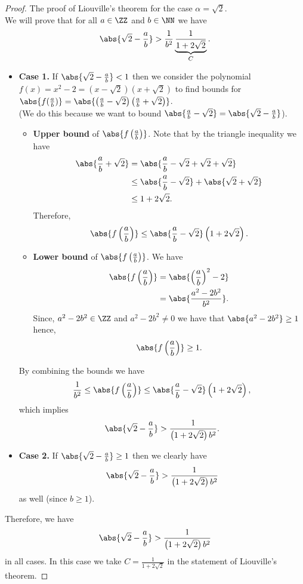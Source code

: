 \documentclass[12pt, a4paper]{article}
\begin{document}
\begin{proof}
    The proof of Liouville's theorem for the case \(\alpha=\sqrt{2}\).\\
    We will prove that for all \(a \in \ZZ\) and \(b \in \NN\) we have
    \[\abs{\sqrt{2}-\frac{a}{b}} > \frac{1}{b^2} \underbrace{\frac{1}{1+2\sqrt{2}}}_{C}.\]
    \begin{itemize}
        \item \textbf{Case 1.} If \(\abs{\sqrt{2}-\frac{a}{b}}<1\) then we consider the polynomial \(f(x)=x^2-2=(x-\sqrt{2})(x+\sqrt{2})\) to find bounds for \(\abs{f(\frac{a}{b})}=\abs{\left( \frac{a}{b} - \sqrt{2} \right) \left( \frac{a}{b} + \sqrt{2}\right)}\). \\
        (We do this because we want to bound \(\abs{\frac{a}{b} - \sqrt{2}}=\abs{\sqrt{2}-\frac{a}{b}}\)).

        \begin{itemize}
            \item \textbf{Upper bound} of \(\abs{f\left( \frac{a}{b} \right)}\). Note that by the triangle inequality we have
            \[\begin{aligned}
                \abs{\frac{a}{b}+\sqrt{2}} &=\abs{\frac{a}{b}-\sqrt{2}+\sqrt{2}+\sqrt{2}}  \\
                &\leq \abs{\frac{a}{b}-\sqrt{2}}+\abs{\sqrt{2}+\sqrt{2}} \\
                &\leq 1+2\sqrt{2}.
            \end{aligned}\]
            Therefore,
            \[\abs{f\left( \frac{a}{b} \right)} \leq \abs{\frac{a}{b}-\sqrt{2}} \left( 1+2\sqrt{2} \right).\]
            \item \textbf{Lower bound} of \(\abs{f\left( \frac{a}{b} \right)}\). We have 
            \[\begin{aligned}
                \abs{f\left( \frac{a}{b} \right)} &=\abs{\left( \frac{a}{b} \right)^2 -2} \\
                &= \abs{\frac{a^2-2b^2}{b^2}}.
            \end{aligned}\]
            Since, \(a^2-2b^2 \in \ZZ\) and \(a^2-2b^2 \neq 0\) we have that \(\abs{a^2-2b^2}\geq 1\) hence,
            \[\abs{f\left( \frac{a}{b} \right)} \geq 1.\]
        \end{itemize}
        By combining the bounds we have
        \[\frac{1}{b^2} \leq \abs{f\left( \frac{a}{b} \right)} \leq \abs{\frac{a}{b}-\sqrt{2}}\left( 1+2\sqrt{2} \right),\]
        which implies
        \[\abs{\sqrt{2}-\frac{a}{b}} > \frac{1}{\left( 1+2\sqrt{2} \right)b^2}.\]

        \item \textbf{Case 2.} If \(\abs{\sqrt{2}-\frac{a}{b}} \geq 1\) then we clearly have 
        \[\abs{\sqrt{2}-\frac{a}{b}} > \frac{1}{\left( 1+2\sqrt{2} \right)b^2}\]
        as well (since \(b \geq 1\)).
    \end{itemize}
    Therefore, we have 
    \[\abs{\sqrt{2}-\frac{a}{b}} > \frac{1}{\left( 1+2\sqrt{2} \right)b^2}\]
    in all cases. In this case we take \(C=\frac{1}{1+2\sqrt{2}}\) in the statement of Liouville's theorem.
\end{proof}
\end{document}
